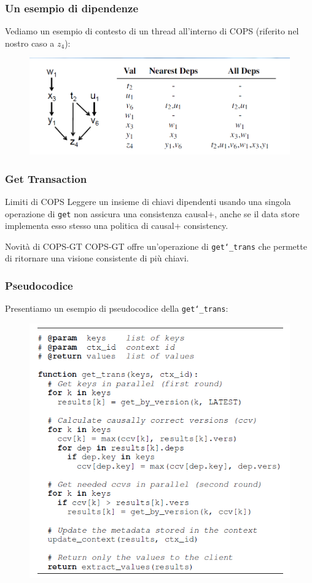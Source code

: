 \begin{frame}
\frametitle{Un esempio di dipendenze}
Vediamo un esempio di contesto di un thread all'interno di COPS
(riferito nel nostro caso a $z_4$):
\begin{figure}
	\centering
	\includegraphics[scale=0.35]{COPS/COPS4.png}
\end{figure}
\end{frame}

\begin{frame}
\frametitle{Get Transaction}
\begin{block}{Limiti di COPS}
Leggere un insieme di chiavi dipendenti usando una singola operazione di \texttt{get}
non assicura una consistenza causal+, anche se il data store implementa esso stesso
una politica di causal+ consistency.
\end{block}
\begin{block}{Novità di COPS-GT}
COPS-GT offre un'operazione di \texttt{get\char`_trans} che permette di
ritornare una visione consistente di più chiavi.
\end{block}
\end{frame}

\begin{frame}
\frametitle{Pseudocodice}
Presentiamo un esempio di pseudocodice della \texttt{get\char`_trans}:
\begin{figure}
	\centering
	\includegraphics[scale=0.40]{COPS/COPS5.png}
\end{figure}
\end{frame}
